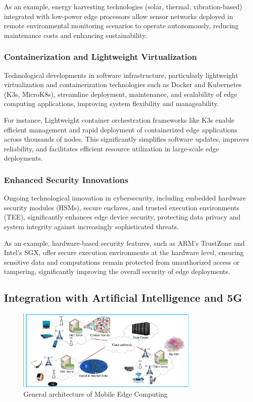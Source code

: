 \documentclass[runningheads]{llncs}
\begin{document}
\noindent As an example, energy harvesting technologies (solar, thermal, vibration-based) integrated with low-power edge processors allow sensor networks deployed in remote environmental monitoring scenarios to operate autonomously, reducing maintenance costs and enhancing sustainability.

\subsubsection{Containerization and Lightweight Virtualization}
Technological developments in software infrastructure, particularly lightweight virtualization and containerization technologies such as Docker and Kubernetes (K3s, MicroK8s), streamline deployment, maintenance, and scalability of edge computing applications, improving system flexibility and manageability.

\noindent For instance, Lightweight container orchestration frameworks like K3s enable efficient management and rapid deployment of containerized edge applications across thousands of nodes. This significantly simplifies software updates, improves reliability, and facilitates efficient resource utilization in large-scale edge deployments.

\subsubsection{Enhanced Security Innovations}
Ongoing technological innovation in cybersecurity, including embedded hardware security modules (HSMs), secure enclaves, and trusted execution environments (TEE), significantly enhances edge device security, protecting data privacy and system integrity against increasingly sophisticated threats.

\noindent As an example, hardware-based security features, such as ARM's TrustZone and Intel's SGX, offer secure execution environments at the hardware level, ensuring sensitive data and computations remain protected from unauthorized access or tampering, significantly improving the overall security of edge deployments.


\subsection{Integration with Artificial Intelligence and 5G}


\begin{figure}[ht]
    \centering
    \includegraphics[width=0.8\textwidth]{IMG/4.png}
    \caption{General architecture of Mobile Edge Computing}
    \label{fig:mec_architecture}
    \end{figure}
\FloatBarrier
\end{document}
